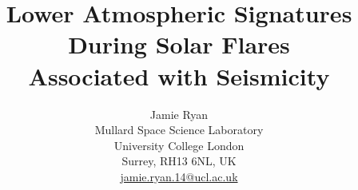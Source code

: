 \documentclass[11pt]{article}
\title{Lower Atmospheric Signatures During Solar Flares \\ Associated with Seismicity}
\author{Jamie Ryan \\
Mullard Space Science Laboratory \\
University College London \\
Surrey, RH13 6NL, UK\\
\href{mailto:jamie.ryan.14@ucl.ac.uk}{jamie.ryan.14@ucl.ac.uk}
\date{}}
\begin{document}
\maketitle
\tableofcontents

%
%
%
%
%
%
%

%

\label{Bibliography}
%
\end{document}
